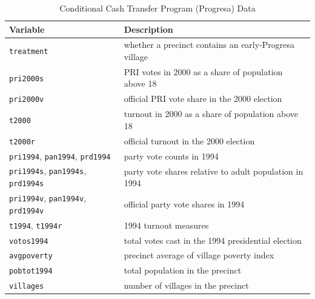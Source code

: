 \documentclass[12pt]{article}
\begin{document}
\begin{table}[H]
\centering
\caption{Conditional Cash Transfer Program (Progresa) Data}
\label{table:cash_transfer_optional}
\begin{tabular}{ll}
\toprule
\textbf{Variable} & \textbf{Description} \\
\midrule
\texttt{treatment} & whether a precinct contains an early-Progresa village \\
\texttt{pri2000s} & PRI votes in 2000 as a share of population above 18 \\
\texttt{pri2000v} & official PRI vote share in the 2000 election \\
\texttt{t2000} & turnout in 2000 as a share of population above 18 \\
\texttt{t2000r} & official turnout in the 2000 election \\
\texttt{pri1994}, \texttt{pan1994}, \texttt{prd1994} & party vote counts in 1994 \\
\texttt{pri1994s}, \texttt{pan1994s}, \texttt{prd1994s} & party vote shares relative to adult population in 1994 \\
\texttt{pri1994v}, \texttt{pan1994v}, \texttt{prd1994v} & official party vote shares in 1994 \\
\texttt{t1994}, \texttt{t1994r} & 1994 turnout measures \\
\texttt{votos1994} & total votes cast in the 1994 presidential election \\
\texttt{avgpoverty} & precinct average of village poverty index \\
\texttt{pobtot1994} & total population in the precinct \\
\texttt{villages} & number of villages in the precinct \\
\bottomrule
\end{tabular}
\end{table}
\end{document}
